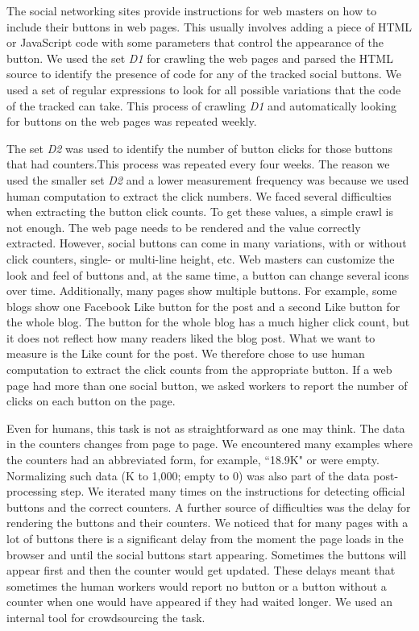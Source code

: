 \documentclass{sig-alternate}
\begin{document}
The social networking sites provide instructions for web masters on how to include their buttons in web pages. This usually involves adding a piece of HTML or JavaScript code with some parameters that control the appearance of the button. We used the set \emph{D1} for crawling the web pages and parsed the HTML source to identify the presence of code for any of the tracked social buttons. We used a set of regular expressions to look for all possible variations that the code of the tracked can take. This process of crawling \emph{D1} and automatically looking for buttons on the web pages was repeated weekly. 

The set \emph{D2} was used to identify the number of button clicks for those buttons that had counters.This process was repeated every four weeks. The reason we used the smaller set \emph{D2} and a lower measurement frequency was because we used human computation to extract the click numbers. 
We faced several difficulties when extracting the button click counts. To get these values, a simple crawl is not enough. The web page needs to be rendered and the value correctly extracted. However, social buttons can come in many variations, with or without click counters, single- or multi-line height, etc. Web masters can customize the look and feel of buttons and, at the same time, a button can change several icons over time. Additionally, many pages show multiple buttons. For example, some blogs show one Facebook Like button for the post and a second Like button for the whole blog. The button for the whole blog has a much higher click count, but it does not reflect how many readers liked the blog post. What we want to measure is the Like count for the post. We therefore chose to use human computation to extract the click counts from the appropriate button. If a web page had more than one social button, we asked workers to report the number of clicks on each button on the page. 

Even for humans, this task is not as straightforward as one may think. The data in the counters changes from page to page. We encountered many examples where the counters had an abbreviated form, for example, ``18.9K" or were empty. Normalizing such data (K to 1,000; empty to 0) was also part of the data post-processing step. We iterated many times on the instructions for detecting official buttons and the correct counters. 
A further source of difficulties was the delay for rendering the buttons and their counters. We noticed that for many pages with a lot of buttons there is a significant delay from the moment the page loads in the browser and until the social buttons start appearing. Sometimes the buttons will appear first and then the counter would get updated. These delays meant that sometimes the human workers would report no button or a button without a counter when one would have appeared if they had waited longer.  We used an internal tool for crowdsourcing the task.
\end{document}

